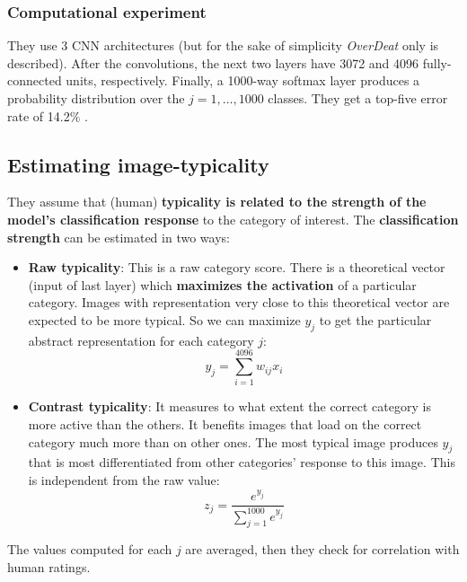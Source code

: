 
\subsubsection{Computational experiment}
They use 3 CNN architectures (but for the sake of simplicity \textit{OverDeat} only is described). After the convolutions, the next two layers have 3072 and 4096 fully-connected units, respectively.
Finally, a 1000-way softmax layer produces a probability distribution over the $j = 1,\dots,1000$ classes. They get a top-five error rate of 14.2\% \notet.


\subsection{Estimating image-typicality}
They assume that (human) \textbf{typicality is related to the strength of the model's classification response} to the category of interest.
The \textbf{classification strength} can be estimated in two ways:
\begin{itemize}
    \item \textbf{Raw typicality}: This is a raw category score. There is a theoretical vector (input of last layer) which \textbf{maximizes the activation} of a particular category. Images with representation very close to this theoretical vector are expected to be more typical. So we can maximize $y_j$ to get the particular abstract representation for each category $j$:
    \[
    y_j = \sum_{i=1}^{4096} w_{ij}x_i
    \]
    \item \textbf{Contrast typicality}: It measures to what extent the correct category is more active than the others. It benefits images that load on the correct category much more than on other ones. The most typical image produces $y_j$ that is most differentiated from other categories' response to this image. This is independent from the raw value:
    \[
    z_j = \frac{e^{y_j}}{ \sum_{j=1}^{1000} e^{y_j} }
    \]
\end{itemize}

The values computed for each $j$ are averaged, then they check for correlation with human ratings.

